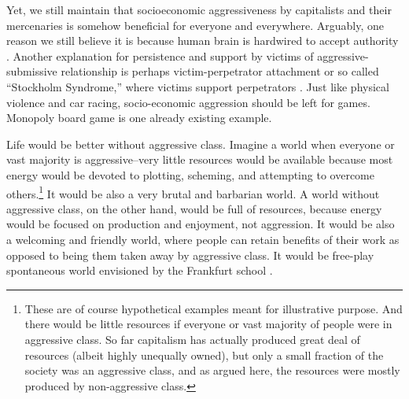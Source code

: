 \documentclass[11pt, letterpaper]{article}
\begin{document}
\begin{spacing}{2.0}
Yet, we still maintain that socioeconomic aggressiveness by
capitalists and their mercenaries is somehow beneficial for everyone and
everywhere. Arguably, one reason we still believe it is because human brain is hardwired to accept authority \citep{milgram78}.
Another explanation for persistence and support by
victims of aggressive-submissive relationship is perhaps victim-perpetrator attachment or
so called ``Stockholm Syndrome,'' where victims support perpetrators
\citep{van2012traumatic,graham1988survivors,van1989compulsion}.
 Just like
physical violence and car racing, socio-economic aggression  should be left for
games. Monopoly board game is one already existing example.

Life would be better without aggressive class. Imagine a world when everyone or
vast majority is aggressive--very little resources would be available because
most energy would be devoted to plotting, scheming, and attempting to overcome
others.\footnote{These are of course hypothetical examples meant for
  illustrative purpose. And there would be
  little resources if everyone or vast majority of people were in aggressive
  class. So far capitalism has actually produced great deal of resources (albeit
highly unequally owned), but only a small fraction of the society was an
aggressive class, and as argued here, the resources were mostly produced by
non-aggressive class.} It would be also a very brutal and barbarian world. A world without
aggressive class, on the other hand, would be full of resources, because energy
would be focused on production and enjoyment, not aggression. It would be also a welcoming and
friendly world, where people can retain benefits of their work as opposed to
being them taken away by aggressive class. It would be free-play spontaneous
world envisioned by the Frankfurt school \citep{marcuse15,marcuse13,fromm92,fromm12,fromm64,fromm62,fromm44,fromm94}.



\end{spacing}
\end{document}
